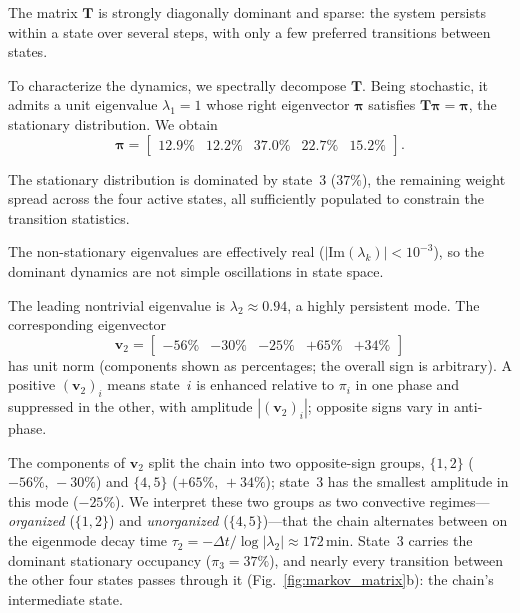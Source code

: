 \documentclass[
    aps,
    prl,
    reprint,
    superscriptaddress,
    amsmath,amssymb,
    floatfix,
    nofootinbib
]{revtex4-2}
\begin{document}
The matrix $\mathbf{T}$ is strongly diagonally dominant and sparse: the system persists within a state over several steps, with only a few preferred transitions between states.

To characterize the dynamics, we spectrally decompose $\mathbf{T}$. Being stochastic, it admits a unit eigenvalue $\lambda_1=1$ whose right eigenvector $\boldsymbol{\pi}$ satisfies $\mathbf{T}\boldsymbol{\pi}=\boldsymbol{\pi}$, the stationary distribution. We obtain
\begin{equation}
\boldsymbol{\pi} =
\begin{bmatrix}
12.9\% & 12.2\% & 37.0\% & 22.7\% & 15.2\%
\end{bmatrix}.
\label{eq:canon}
\end{equation}

The stationary distribution is dominated by state~3 ($37\%$), the remaining weight spread across the four active states, all sufficiently populated to constrain the transition statistics.

The non-stationary eigenvalues are effectively real ($|\mathrm{Im}(\lambda_k)|<10^{-3}$), so the dominant dynamics are not simple oscillations in state space.

The leading nontrivial eigenvalue is $\lambda_2 \approx 0.94$, a highly persistent mode. The corresponding eigenvector
\begin{equation}
\mathbf{v}_2 =
\begin{bmatrix}
-56\% & -30\% & -25\% & +65\% & +34\%
\end{bmatrix}
\end{equation}
has unit norm (components shown as percentages; the overall sign is arbitrary). A positive $(\mathbf{v}_2)_i$ means state~$i$ is enhanced relative to $\pi_i$ in one phase and suppressed in the other, with amplitude $|(\mathbf{v}_2)_i|$; opposite signs vary in anti-phase.

The components of $\mathbf{v}_2$ split the chain into two opposite-sign groups, $\{1,2\}$ ($-56\%,\,-30\%$) and $\{4,5\}$ ($+65\%,\,+34\%$); state~3 has the smallest amplitude in this mode ($-25\%$). We interpret these two groups as two convective regimes---\emph{organized} ($\{1,2\}$) and \emph{unorganized} ($\{4,5\}$)---that the chain alternates between on the eigenmode decay time $\tau_2 = -\Delta t / \log|\lambda_2| \approx 172\,\mathrm{min}$. State~3 carries the dominant stationary occupancy ($\pi_3=37\%$), and nearly every transition between the other four states passes through it (Fig.~\ref{fig:markov_matrix}b): the chain's intermediate state.
\end{document}
